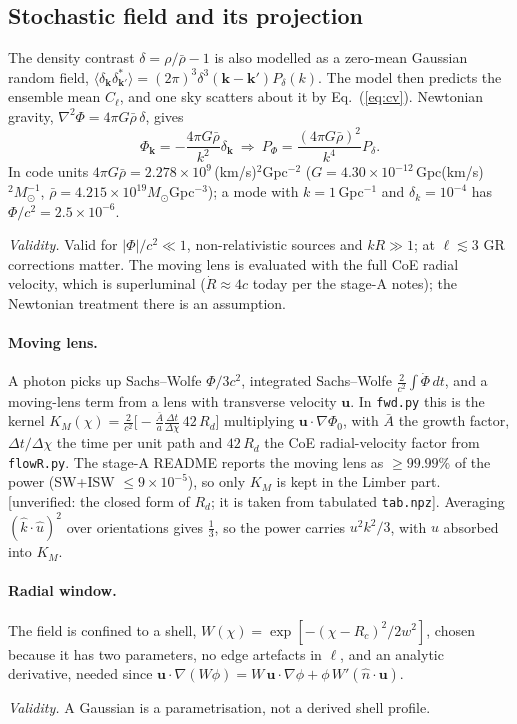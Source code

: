 \documentclass[10pt,twocolumn]{article}
\newcommand{\why}[1]{\par\noindent\textit{Validity.} #1\par}
\newcommand{\flag}[1]{\textsf{[unverified: #1]}}
\begin{document}
\subsection{Stochastic field and its projection}\label{sec:field}
The density contrast $\delta=\rho/\bar\rho-1$ is also modelled as a zero-mean Gaussian random field, $\langle\delta_{\mathbf k}\delta^*_{\mathbf k'}\rangle=(2\pi)^3\delta^3(\mathbf k-\mathbf k')P_\delta(k)$. The model then predicts the ensemble mean $C_\ell$, and one sky scatters about it by Eq.~(\ref{eq:cv}). Newtonian gravity, $\nabla^2\Phi=4\pi G\bar\rho\,\delta$, gives
\begin{equation}
\Phi_{\mathbf k}=-\frac{4\pi G\bar\rho}{k^2}\delta_{\mathbf k}\ \Rightarrow\ P_\Phi=\frac{(4\pi G\bar\rho)^2}{k^4}P_\delta .
\end{equation}
In code units $4\pi G\bar\rho=2.278\times10^9$\,(km/s)$^2$Gpc$^{-2}$ ($G=4.30\times10^{-12}$\,Gpc(km/s)$^2M_\odot^{-1}$, $\bar\rho=4.215\times10^{19}M_\odot$Gpc$^{-3}$); a mode with $k=1$\,Gpc$^{-1}$ and $\delta_k=10^{-4}$ has $\Phi/c^2=2.5\times10^{-6}$.
\why{Valid for $|\Phi|/c^2\ll1$, non-relativistic sources and $kR\gg1$; at $\ell\lesssim3$ GR corrections matter. The moving lens is evaluated with the full CoE radial velocity, which is superluminal ($\dot R\approx4c$ today per the stage-A notes); the Newtonian treatment there is an assumption.}

\paragraph{Moving lens.} A photon picks up Sachs--Wolfe $\Phi/3c^2$, integrated Sachs--Wolfe $\frac{2}{c^2}\int\dot\Phi\,dt$, and a moving-lens term from a lens with transverse velocity $\mathbf u$. In \texttt{fwd.py} this is the kernel $K_M(\chi)=\frac{2}{c^2}\big[-\frac{\bar A}{a}\frac{\Delta t}{\Delta\chi}\,42\,R_d\big]$ multiplying $\mathbf u\cdot\nabla\Phi_0$, with $\bar A$ the growth factor, $\Delta t/\Delta\chi$ the time per unit path and $42\,R_d$ the CoE radial-velocity factor from \texttt{flowR.py}. The stage-A README reports the moving lens as $\ge99.99\%$ of the power (SW+ISW $\le9\times10^{-5}$), so only $K_M$ is kept in the Limber part. \flag{the closed form of $R_d$; it is taken from tabulated \texttt{tab.npz}}. Averaging $(\hat k\cdot\hat u)^2$ over orientations gives $\tfrac13$, so the power carries $u^2k^2/3$, with $u$ absorbed into $K_M$.

\paragraph{Radial window.} The field is confined to a shell, $W(\chi)=\exp[-(\chi-R_c)^2/2w^2]$, chosen because it has two parameters, no edge artefacts in $\ell$, and an analytic derivative, needed since $\mathbf u\cdot\nabla(W\phi)=W\,\mathbf u\cdot\nabla\phi+\phi\,W'(\hat n\cdot\mathbf u)$.
\why{A Gaussian is a parametrisation, not a derived shell profile.}
\end{document}
